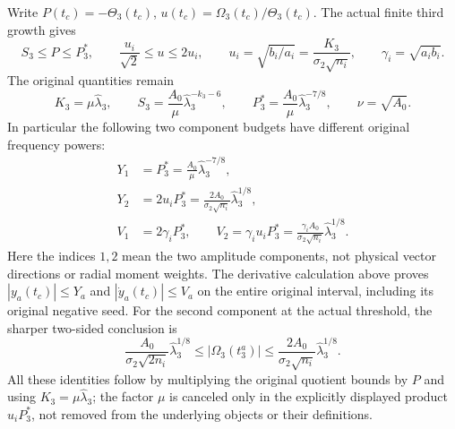 \documentclass[11pt]{article}
\begin{document}
Write $P(t_c)=-\Theta_3(t_c)$, $u(t_c)=\Omega_3(t_c)/\Theta_3(t_c)$.
The actual finite third growth gives
\[
 S_3\le P\le P_3^*,\qquad
 \frac{u_i}{\sqrt2}\le u\le2u_i,\qquad
 u_i=\sqrt{b_i/a_i}=\frac{K_3}{\sigma_2\sqrt{n_i}},
 \qquad \gamma_i=\sqrt{a_ib_i}.
\]
The original quantities remain
\[
 K_3=\mu\widehat\lambda_3,\qquad
 S_3=\frac{A_0}{\mu}\widehat\lambda_3^{-k_3-6},\qquad
 P_3^*=\frac{A_0}{\mu}\widehat\lambda_3^{-7/8},\qquad
 \nu=\sqrt{A_0}.
\]
In particular the following two component budgets have different
original frequency powers:
\begin{equation}
 \begin{split}
 Y_1&=P_3^*=\frac{A_0}{\mu}\widehat\lambda_3^{-7/8},\\
 Y_2&=2u_iP_3^*
      =\frac{2A_0}{\sigma_2\sqrt{n_i}}\widehat\lambda_3^{1/8},\\
 V_1&=2\gamma_iP_3^*,\qquad
 V_2=\gamma_i u_iP_3^*
      =\frac{\gamma_i A_0}{\sigma_2\sqrt{n_i}}
                       \widehat\lambda_3^{1/8}.
 \end{split}\label{tgq:budgets}
\end{equation}
Here the indices $1,2$ mean the two amplitude components, not physical
vector directions or radial moment weights. The derivative calculation
above proves
$|y_a(t_c)|\le Y_a$ and $|\dot y_a(t_c)|\le V_a$ on the entire
original interval, including its original negative seed.
For the second component at the actual threshold, the sharper two-sided
conclusion is
\[
 \frac{A_0}{\sigma_2\sqrt{2n_i}}\widehat\lambda_3^{1/8}
 \le |\Omega_3(t_3^a)|
 \le \frac{2A_0}{\sigma_2\sqrt{n_i}}\widehat\lambda_3^{1/8}.
\]
All these identities follow by multiplying the original quotient bounds
by $P$ and using $K_3=\mu\widehat\lambda_3$; the factor $\mu$ is
canceled only in the explicitly displayed product $u_iP_3^*$, not
removed from the underlying objects or their definitions.
\end{document}
